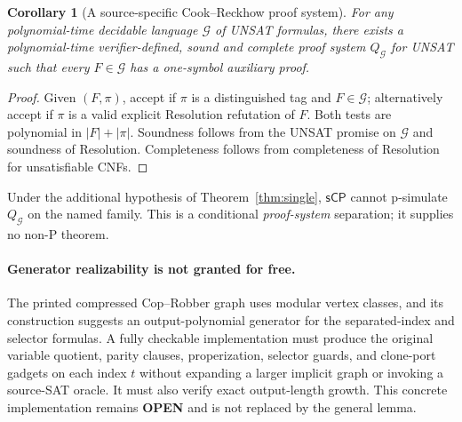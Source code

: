 \documentclass[11pt]{article}
\newtheorem{corollary}[theorem]{Corollary}
\newcommand{\sCP}{\mathsf{sCP}}
\newcommand{\OPEN}{\textbf{OPEN}}
\begin{document}
\begin{corollary}[A source-specific Cook--Reckhow proof system]
\label{cor:proofsystem}
For any polynomial-time decidable language $\mathcal G$ of UNSAT
formulas, there exists a polynomial-time verifier-defined,
sound and complete proof system $Q_{\mathcal G}$ for UNSAT such
that every $F\in\mathcal G$ has a one-symbol auxiliary proof.
\end{corollary}
\begin{proof}
Given $(F,\pi)$, accept if $\pi$ is a distinguished tag and
$F\in\mathcal G$; alternatively accept if $\pi$ is a valid
explicit Resolution refutation of $F$. Both tests are polynomial
in $|F|+|\pi|$. Soundness follows from the UNSAT promise on
$\mathcal G$ and soundness of Resolution. Completeness follows
from completeness of Resolution for unsatisfiable CNFs.
\end{proof}
\noindent Under the additional hypothesis of
Theorem~\ref{thm:single}, $\sCP$ cannot p-simulate
$Q_{\mathcal G}$ on the named family. This is a conditional
\emph{proof-system} separation; it supplies no non-P theorem.

\paragraph{Generator realizability is not granted for free.}
The printed compressed Cop--Robber graph uses modular vertex
classes, and its construction suggests an output-polynomial
generator for the separated-index and selector formulas.
A fully checkable implementation must produce the original
variable quotient, parity clauses, properization, selector
guards, and clone-port gadgets on each index $t$ without
expanding a larger implicit graph or invoking a source-SAT
oracle. It must also verify exact output-length growth.
This concrete implementation remains \OPEN{} and is not
replaced by the general lemma.
\end{document}
